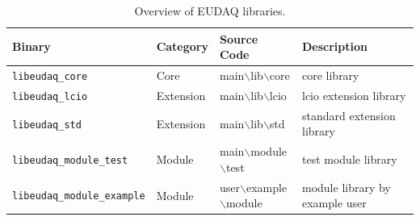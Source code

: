 \begin{table}
\centering
\small
\begin{tabular}{ l | l | l | p{4cm}}
  \textbf{Binary} & \textbf{Category} & \textbf{Source Code} & \textbf{Description}\\
  \hline
  \hline
  \texttt{libeudaq\_core} & Core & main$\backslash$lib$\backslash$core & core library \\
  \hline
  \texttt{libeudaq\_lcio} & Extension & main$\backslash$lib$\backslash$lcio & lcio extension library \\
  \texttt{libeudaq\_std} & Extension & main$\backslash$lib$\backslash$std & standard extension library \\
  \hline
  \texttt{libeudaq\_module\_test} & Module & main$\backslash$module$\backslash$test & test module library \\
  \texttt{libeudaq\_module\_example} & Module & user$\backslash$example$\backslash$module &  module library by example user\\
\end{tabular}
\caption{Overview of EUDAQ libraries.}
\label{tab:liball}
\end{table}
